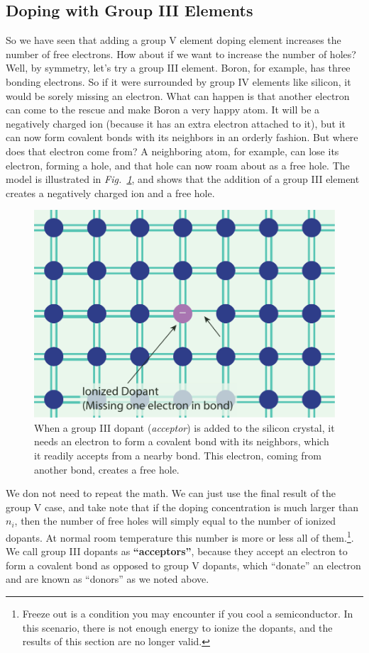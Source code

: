 \subsection{Doping with Group III Elements}
So we have seen that adding a group V element doping element increases the number of free electrons.  How about if we want to increase the number of holes?  Well, by symmetry, let’s try a group III element.  Boron, for example, has three bonding electrons. So if it were surrounded by group IV elements like silicon, it would be sorely missing an electron.  What can happen is that another electron can come to the rescue and make Boron a very happy atom. It will be a negatively charged ion (because it has an extra electron attached to it), but it can now form covalent bonds with its neighbors in an orderly fashion.  But where does that electron come from?  A neighboring atom, for example, can lose its electron, forming a hole, and that hole can now roam about as a free hole.  The model is illustrated in \emph{Fig.~\ref{fig:silicoN_Dopant_III}}, and shows that the addition of a group III element creates a negatively charged ion and a free hole.
\begin{figure}[tb]
\centering
\includegraphics[width=.5\columnwidth]{silicoN_Dopant_III}
\caption{When a group III dopant (\emph{acceptor}) is added to the silicon crystal, it needs an electron to form a covalent bond with its neighbors, which it readily accepts from a nearby bond.  This electron, coming from another bond, creates a free hole.}
\label{fig:silicoN_Dopant_III}
\end{figure}

We don not need to repeat the math.  We can just use the final result of the group V case, and take note that if the doping concentration is much larger than $n_i$, then the number of free holes will simply equal to the number of ionized dopants.  At normal room temperature this number is more or less all of them.\footnote{Freeze out is a condition you may encounter if you cool a semiconductor.  In this scenario, there is not enough energy to ionize the dopants, and the results of this section are no longer valid.}. We call group III dopants as \textbf{“acceptors”}, because they accept an electron to form a covalent bond as opposed to group V dopants, which “donate” an electron and are known as “donors” as we noted above.

